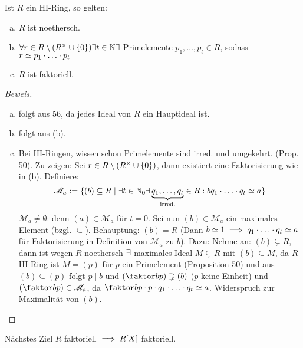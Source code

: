 \documentclass[a4paper]{report}
\begin{document}
\begin{kor}
  Ist $R$ ein HI-Ring, so gelten:
  \begin{enumerate}[(a)]
    \item $R$ ist noethersch.
    \item $\forall r \in R \setminus (R^\times \cup \{0\}) \exists t \in \mathbb{N} \exists$ Primelemente $p_{1}, \ldots, p_{t} \in R$, sodass $r \simeq p_{1} \cdot \ldots \cdot p_{t}$
    \item $R$ ist faktoriell.
  \end{enumerate}
\begin{proof}[Beweis]
  \begin{enumerate}[(a)]
    \item folgt aus 56, da jedes Ideal von $R$ ein Hauptideal ist.
    \item folgt aus (b).
    \item Bei HI-Ringen, wissen schon Primelemente sind irred. und umgekehrt. (Prop. 50).
          Zu zeigen: Sei $r \in R \setminus (R^\times \cup \{0\})$, dann existiert eine Faktorisierung wie in (b). Definiere: \[\mathscr M_{a}:=\{(b) \subseteq R \mid \exists t \in \mathbb{N}_0 \exists \underbrace{q_{1}, \ldots, q_{t}}_{\text{irred.}} \in R : bq_{1}\cdot \ldots \cdot q_{t} \simeq a\}\]
          $\mathscr M_{a} \ne \emptyset$: denn $(a) \in \mathscr M_{a}$ für $t = 0$. Sei nun $(b) \in \mathscr M_{a}$ ein maximales Element (bzgl. $\subseteq$). Behauptung: $(b) = R$ (Dann $b \simeq 1 \implies q_{1} \cdot \ldots \cdot q_{t} \simeq a$ für Faktorisierung in Definition von $\mathscr M_{a}$ zu $b$). Dazu: Nehme an: $(b) \subsetneq R$, dann ist wegen $R$ noethersch $\exists$ maximales Ideal $M \subsetneq R$ mit $(b) \subseteq M$, da $R$ HI-Ring ist $M= (p)$ für $p$ ein Primelement (Proposition 50) und aus $(b) \subseteq (p)$ folgt $p \mid b$ und $(\fak bp) \supsetneq (b)$ ($p$ keine Einheit) und $(\fak bp) \in \mathscr M_{a}$, da $\fak bp \cd p \cd q_{1} \cld q_{t}\simeq a$. Widerspruch zur Maximalität von $(b)$.
  \end{enumerate}
\end{proof}
\end{kor}
\begin{bem*}
Nächstes Ziel $R$ faktoriell $\implies R[X]$ faktoriell.
\end{bem*}
\end{document}

